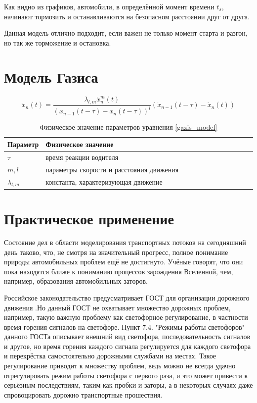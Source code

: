 \documentclass[12pt, a4paper]{extarticle}
\numberwithin{equation}{section}
\begin{document}
Как видно из графиков, автомобили, в определённой момент времени $t_s$, начинают тормозить и останавливаются на безопасном расстоянии друг от друга. 

Данная модель отлично подходит, если важен не только момент старта и разгон, но так же торможение и остановка.

\section{Модель Газиса}

\begin{equation} \label{gazis_model}
\ddot{x}_n(t) = \dfrac{\lambda_{l,m}\dot{x}_n^m(t)}{(x_{n-1}(t-\tau)-x_n(t-\tau))^l}(\dot{x}_{n-1}(t-\tau)-\dot{x}_{n}(t))
\end{equation}

\begin{table}[h!]
	\caption{Физическое значение параметров уравнения \eqref{gazis_model}}
	\label{gazis_parameters}
	\begin{center}
		\begin{tabularx}{\textwidth}{p{0.15\linewidth}p{0.85\linewidth}}			
			\hline
			\rule{0cm}{0,5cm}
			Параметр &  Физическое значение \\ 
			[3pt]\hline
			$\tau$ & время реакции водителя \\
			$m, l$ & параметры скорости и расстояния движения \\
			$\lambda_{l,m} $ & константа, характеризующая движение  \\ 
			\hline
		\end{tabularx}
	\end{center}
\end{table} 

\section{Практическое применение} 

Состояние дел в области моделирования транспортных потоков на сегодняшний день таково, что, не смотря на значительный прогресс, полное понимание природы автомобильных проблем ещё не достигнуто. Учёные
говорят, что они пока находятся ближе к пониманию процессов зарождения Вселенной, чем, например, образования автомобильных заторов. 

Российское законодательство предусматривает ГОСТ для организации дорожного движения \cite{Gost}.Но данный ГОСТ не охватывает множество дорожных проблем, например, такую важную проблему как светофорное регулирование, в частности время горения сигналов на светофоре. Пункт 7.4. "Режимы работы светофоров"  данного ГОСТа описывает внешний вид светофора, последовательность сигналов и другое, но время горения каждого сигнала регулируется для каждого светофора и перекрёстка самостоятельно дорожными службами на местах. Такое регулирование приводит к множеству проблем, ведь можно не всегда удачно отрегулировать режим работы светофора с первого раза, и это может привести к серьёзным последствиям, таким как пробки и заторы, а в некоторых случаях даже спровоцировать дорожно транспортные прошествия.
\end{document}
